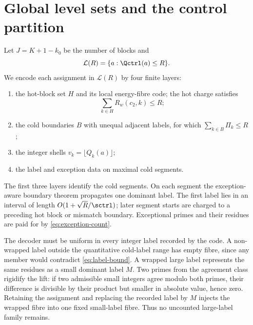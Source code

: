 \section{Global level sets and the control partition}\label{sec:global}

Let $J=K+1-k_0$ be the number of blocks and
\[
 \mathcal L(R)=\{a:\Qctrl(a)\le R\}.
\]
We encode each assignment in $\mathcal L(R)$ by four finite layers:
\begin{enumerate}[label=(\arabic*)]
\item the hot-block set $H$ and its local energy-fibre code; the hot charge
satisfies
\[
 \sum_{k\in H}R_w(c_2,k)\le R;
\]
\item the cold boundaries $B$ with unequal adjacent labels, for which
$\sum_{k\in B}\Pi_k\le R$;
\item the integer shells $v_k=\lfloor Q_k(a)\rfloor$;
\item the label and exception data on maximal cold segments.
\end{enumerate}
The first three layers identify the cold segments.  On each segment the
exception-aware boundary theorem propagates one dominant label.  The first
label lies in an interval of length
$O(1+\sqrt R/\sctrl)$; later segment starts are charged to a preceding hot
block or mismatch boundary.  Exceptional primes and their residues are paid
for by \eqref{eq:exception-count}.

The decoder must be uniform in every integer label recorded by the code.  A
non-wrapped label outside the quantitative cold-label range has empty fibre,
since any member would contradict \eqref{eq:label-bound}.  A wrapped large
label represents the same residues as a small dominant label $M$.  Two primes
from the agreement class rigidify the lift: if two admissible small integers
agree modulo both primes, their difference is divisible by their product but
smaller in absolute value, hence zero.  Retaining the assignment and replacing
the recorded label by $M$ injects the wrapped fibre into one fixed small-label
fibre.  Thus no uncounted large-label family remains.

